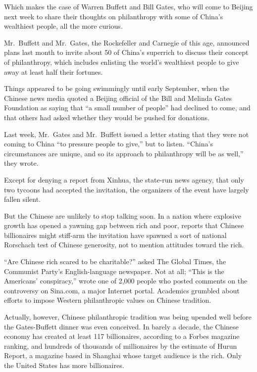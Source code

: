 ﻿\documentclass[12pt]{article}
\begin{document}
Which makes the case of Warren Buffett and Bill Gates, who will come to Beijing next week to share
their thoughts on philanthropy with some of China's wealthiest people, all the more curious.

Mr.~Buffett and Mr.~Gates, the Rockefeller and Carnegie of this age, announced plans last month to
invite about 50 of China's superrich to discuss their concept of philanthropy, which includes
enlisting the world's wealthiest people to give away at least half their fortunes.

Things appeared to be going swimmingly until early September, when the Chinese news media quoted a
Beijing official of the Bill and Melinda Gates Foundation as saying that ``a small number of
people'' had declined to come, and that others had asked whether they would be pushed for donations.

Last week, Mr.~Gates and Mr.~Buffett issued a letter stating that they were not coming to China ``to
pressure people to give,'' but to listen. ``China's circumstances are unique, and so its approach to
philanthropy will be as well,'' they wrote.

Except for denying a report from Xinhua, the state-run news agency, that only two tycoons had
accepted the invitation, the organizers of the event have largely fallen silent.

But the Chinese are unlikely to stop talking soon. In a nation where explosive growth has opened a
yawning gap between rich and poor, reports that Chinese billionaires might stiff-arm the invitation
have spawned a sort of national Rorschach test of Chinese generosity, not to mention attitudes
toward the rich.

``Are Chinese rich scared to be charitable?'' asked The Global Times, the Communist Party's
English-language newspaper. Not at all; ``This is the Americans' conspiracy,'' wrote one of 2,000
people who posted comments on the controversy on Sina.com, a major Internet portal. Academics
grumbled about efforts to impose Western philanthropic values on Chinese tradition.

Actually, however, Chinese philanthropic tradition was being upended well before the Gates-Buffett
dinner was even conceived. In barely a decade, the Chinese economy has created at least 117
billionaires, according to a Forbes magazine ranking, and hundreds of thousands of millionaires by
the estimate of Hurun Report, a magazine based in Shanghai whose target audience is the rich. Only
the United States has more billionaires.
\end{document}
